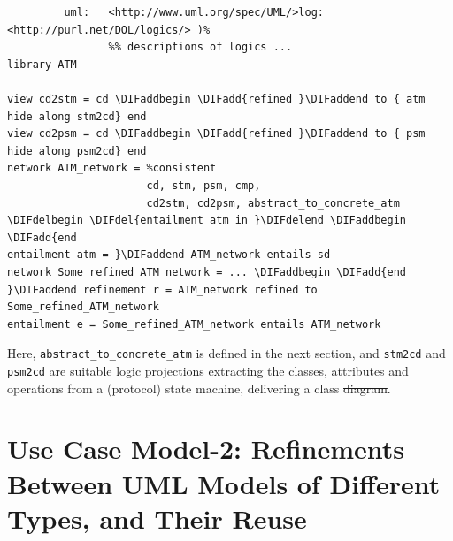 \documentclass[10pt,fleqn,final]{scrreprt}
\newenvironment{definitions}[0]{\medskip }{}
\providecommand{\DIFadd}[1]{{\protect\color{blue}\uwave{#1}}} %
\providecommand{\DIFdel}[1]{{\protect\color{red}\sout{#1}}}                      %
\providecommand{\DIFaddbegin}{} %
\providecommand{\DIFaddend}{} %
\providecommand{\DIFdelbegin}{} %
\providecommand{\DIFdelend}{} %
\begin{document}
\begin{definitions}
\DIFdelbegin %
\DIFdelend \DIFaddbegin \begin{lstlisting}[basicstyle=\ttfamily,language=dolText,escapechar=@,mathescape]
\DIFaddend %prefix( :      <http://www.example.org/uml/>
         uml:   <http://www.uml.org/spec/UML/>log:   <http://purl.net/DOL/logics/> )%
                %% descriptions of logics ...
library ATM

view cd2stm = cd \DIFaddbegin \DIFadd{refined }\DIFaddend to { atm hide along stm2cd} end
view cd2psm = cd \DIFaddbegin \DIFadd{refined }\DIFaddend to { psm hide along psm2cd} end
network ATM_network = %consistent
                      cd, stm, psm, cmp,
                      cd2stm, cd2psm, abstract_to_concrete_atm
\DIFdelbegin \DIFdel{entailment atm in }\DIFdelend \DIFaddbegin \DIFadd{end
entailment atm = }\DIFaddend ATM_network entails sd
network Some_refined_ATM_network = ... \DIFaddbegin \DIFadd{end
}\DIFaddend refinement r = ATM_network refined to Some_refined_ATM_network
entailment e = Some_refined_ATM_network entails ATM_network
\end{lstlisting}
Here, \texttt{abstract\_to\_concrete\_atm} is defined in the next
section, and \texttt{stm2cd} and \texttt{psm2cd} are suitable logic
projections extracting the classes, attributes and operations from a
(protocol) state machine, delivering a class \DIFdelbegin \DIFdel{diagram}\DIFdelend \DIFaddbegin \DIFadd{model}\DIFaddend .

\DIFdelbegin %
\DIFdelend \DIFaddbegin \section{Use Case Model-2: Refinements Between UML Models of Different Types, and Their Reuse}
\DIFaddend \label{model-2}


\end{definitions}
\end{document}
